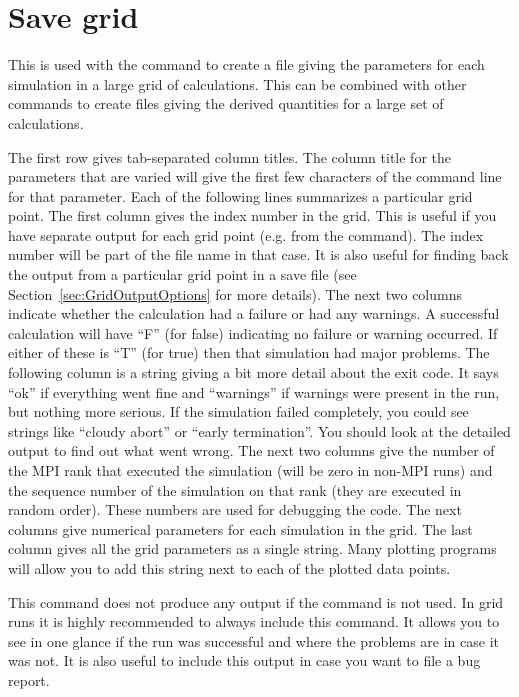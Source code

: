 \section{Save grid}
\label{sec:save:grid}

This is used with the  command to
create a file giving the parameters for each simulation in a large grid
of calculations.  This can be combined with other  commands to create
files giving the derived quantities for a large set of calculations.

The first row gives tab-separated column titles.  The column title for the parameters
that are varied will give the first few characters of the command line for
that parameter.  Each of the following lines summarizes a particular grid point.  The
first column gives the index number in the grid. This is useful if you
have separate output for each grid point (e.g. from the 
command). The index number will be part of the file name in that case. It is
also useful for finding back the output from a particular grid point in a
save file (see Section~\ref{sec:GridOutputOptions} for more details).
The next two columns indicate whether the calculation had a failure or had any
warnings.  A successful calculation will have ``F'' (for false) indicating
no failure or warning occurred.  If either of these is ``T'' (for true) then
that simulation had major problems. The following column is a string giving
a bit more detail about the exit code. It says ``ok'' if everything went fine
and ``warnings'' if warnings were present in the run, but nothing more serious.
If the simulation failed completely, you could see strings like ``cloudy abort''
or ``early termination''. You should look at the detailed output
to find out what went wrong. The next two columns give the number of the
MPI rank that executed the simulation (will be zero in non-MPI runs) and the sequence
number of the simulation on that rank (they are executed in random order). These
numbers are used for debugging the code. The next columns give numerical parameters for
each simulation in the grid.  The last column gives all the grid parameters
as a single string.  Many plotting programs will allow you to add this string
next to each of the plotted data points.

This command does not produce any output if the  command
is not used. In grid runs it is highly recommended to always include this command.
It allows you to see in one glance if the run was successful and where the problems
are in case it was not. It is also useful to include this output in case you want
to file a bug report.

